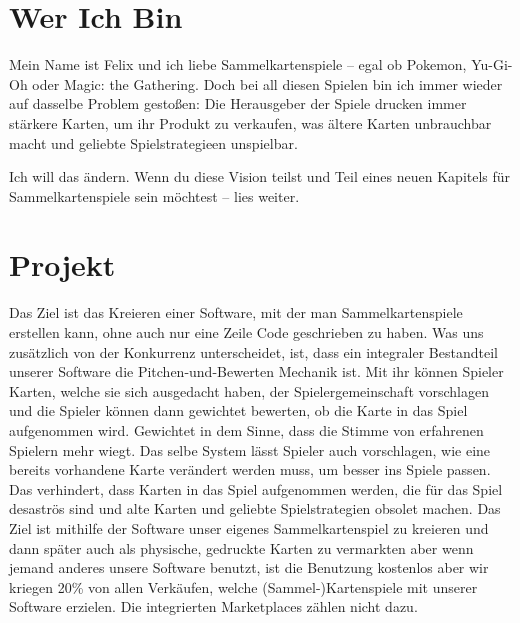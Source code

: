 \documentclass[fontsize=12]{scrartcl}
\begin{document}
	\vfill
	
	
	\newpage
	
	
	\setcounter{page}{2} 
	
	\newpage
	
	\section{Wer Ich Bin}
	
	Mein Name ist Felix und ich liebe Sammelkartenspiele -- egal ob Pokemon, Yu-Gi-Oh oder Magic: the Gathering. Doch bei all diesen Spielen bin ich immer wieder auf dasselbe Problem gestoßen: Die Herausgeber der Spiele drucken immer stärkere Karten, um ihr Produkt zu verkaufen, was ältere Karten unbrauchbar macht und geliebte Spielstrategieen unspielbar.\hfill\newline
	
	\noindent Ich will das ändern. Wenn du diese Vision teilst und Teil eines neuen Kapitels für Sammelkartenspiele sein möchtest -- lies weiter.
	
	\section{Projekt}
	
	Das Ziel ist das Kreieren einer Software, mit der man Sammelkartenspiele erstellen kann, ohne auch nur eine Zeile Code geschrieben zu haben. Was uns zusätzlich von der Konkurrenz unterscheidet, ist, dass ein integraler Bestandteil unserer Software die Pitchen-und-Bewerten Mechanik ist. Mit ihr können Spieler Karten, welche sie sich ausgedacht haben, der Spielergemeinschaft vorschlagen und die Spieler können dann gewichtet bewerten, ob die Karte in das Spiel aufgenommen wird. Gewichtet in dem Sinne, dass die Stimme von erfahrenen Spielern mehr wiegt. Das selbe System lässt Spieler auch vorschlagen, wie eine bereits vorhandene Karte verändert werden muss, um besser ins Spiele passen. Das verhindert, dass Karten in das Spiel aufgenommen werden, die für das Spiel desaströs sind und alte Karten und geliebte Spielstrategien obsolet machen. Das Ziel ist mithilfe der Software unser eigenes Sammelkartenspiel zu kreieren und dann später auch als physische, gedruckte Karten zu vermarkten aber wenn jemand anderes unsere Software benutzt, ist die Benutzung kostenlos aber wir kriegen 20\% von allen Verkäufen, welche (Sammel-)Kartenspiele mit unserer Software erzielen. Die integrierten Marketplaces zählen nicht dazu.\hfill\newline
	
\end{document}
